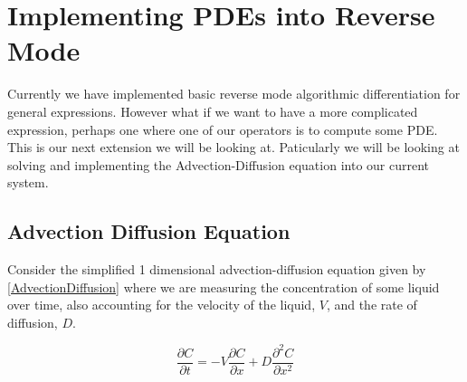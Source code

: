 \documentclass{article}
\begin{document}
\section{Implementing PDEs into Reverse Mode}

Currently we have implemented basic reverse mode algorithmic differentiation for general expressions. However what if we want to have a more complicated expression, perhaps one where one of our operators is to compute some PDE. This is our next extension we will be looking at. Paticularly we will be looking at solving and implementing the Advection-Diffusion equation into our current system.

\subsection{Advection Diffusion Equation}

Consider the simplified 1 dimensional advection-diffusion equation given by \eqref{AdvectionDiffusion} where we are measuring the concentration of some liquid over time, also accounting for the velocity of the liquid, $V$, and the rate of diffusion, $D$.

\begin{equation}
    \label{AdvectionDiffusion}
    \frac{\partial C}{\partial t} = - V\frac{\partial C}{\partial x} + D\frac{\partial^2 C}{\partial x^2}
\end{equation}
\end{document}
